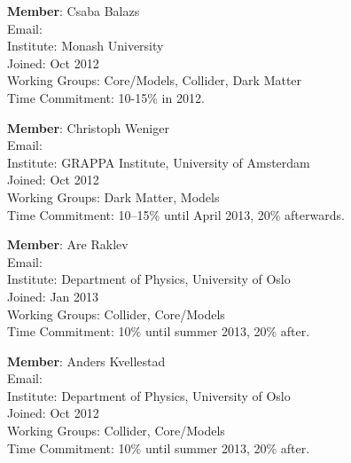 \textbf{Member}: Csaba Balazs\\
Email: \\
Institute: Monash University\\
Joined: Oct 2012\\
Working Groups: Core/Models, Collider, Dark Matter\\
Time Commitment: 10-15\% in 2012. 

\textbf{Member}: Christoph Weniger\\
Email: \\
Institute: GRAPPA Institute, University of Amsterdam\\
Joined: Oct 2012\\
Working Groups: Dark Matter, Models\\
Time Commitment: 10--15\% until April 2013, 20\% afterwards.

\textbf{Member}: Are Raklev\\
Email: \\
Institute: Department of Physics, University of Oslo\\
Joined: Jan 2013\\
Working Groups: Collider, Core/Models\\
Time Commitment: 10\% until summer 2013, 20\% after.

\textbf{Member}: Anders Kvellestad\\
Email: \\
Institute: Department of Physics, University of Oslo\\
Joined: Oct 2012\\
Working Groups: Collider, Core/Models\\
Time Commitment: 10\% until summer 2013, 20\% after.


